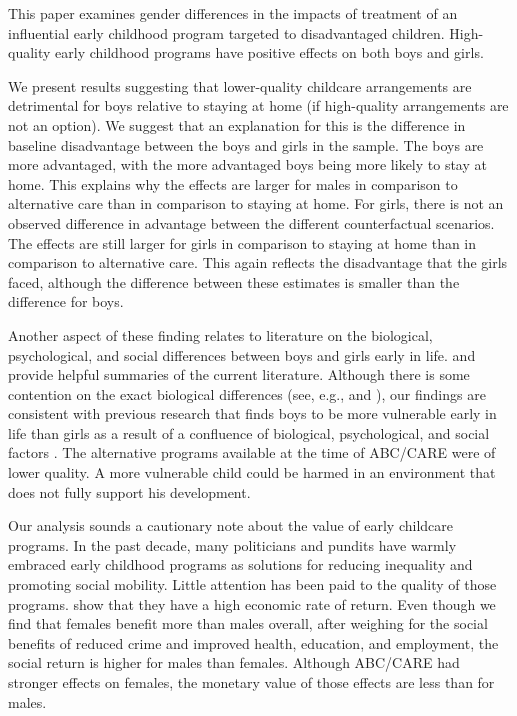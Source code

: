 This paper examines gender differences in the impacts of treatment of an influential early childhood program targeted to disadvantaged children. High-quality early childhood programs have positive effects on both boys and girls. 

We present results suggesting that lower-quality childcare arrangements are detrimental for boys relative to staying at home (if high-quality arrangements are not an option). We suggest that an explanation for this is the difference in baseline disadvantage between the boys and girls in the sample. The boys are more advantaged, with the more advantaged boys being more likely to stay at home. This explains why the effects are larger for males in comparison to alternative care than in comparison to staying at home. For girls, there is not an observed difference in advantage between the different counterfactual scenarios. The effects are still larger for girls in comparison to staying at home than in comparison to alternative care. This again reflects the disadvantage that the girls faced, although the difference between these estimates is smaller than the difference for boys.

Another aspect of these finding relates to literature on the biological, psychological, and social differences between boys and girls early in life. \citet{Schore_2017_IMHJ} and \citet{Eliot_Brain_2009_BOOK} provide helpful summaries of the current literature. Although there is some contention on the exact biological differences (see, e.g., \citet{Tan_Ma_Marwha_etal_2016_NI} and \citet{Eliot_2011_Sex-Diff_Neuron}), our findings are consistent with previous research that finds boys to be more vulnerable early in life than girls as a result of a confluence of biological, psychological, and social factors \citep{Beeghly-etal_2017_IMHJ}. The alternative programs available at the time of ABC/CARE were of lower quality. A more vulnerable child could be harmed in an environment that does not fully support his development.

Our analysis sounds a cautionary note about the value of early childcare programs. In the past decade, many politicians and pundits have warmly embraced early childhood programs as solutions for reducing inequality and promoting social mobility. Little attention has been paid to the quality of those programs. \cite{Garcia_Heckman_Leaf_etal_2017_Comp_CBA_Unpublished} show that they have a high economic rate of return. Even though we find that females benefit more than males overall, after weighing for the social benefits of reduced crime and improved health, education, and employment, the social return is higher for males than females. Although ABC/CARE had stronger effects on females, the monetary value of those effects are less than for males. 


